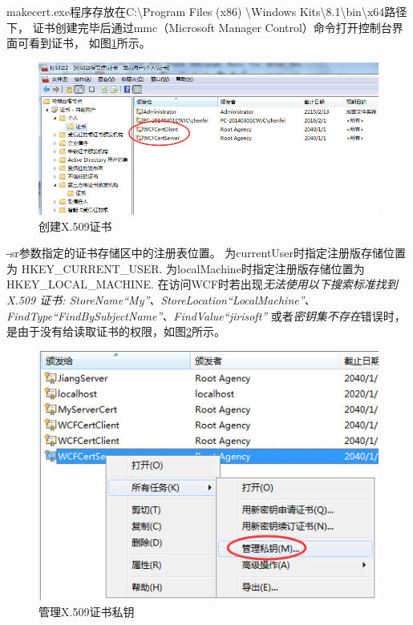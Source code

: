 \documentclass{book}
\begin{document}
makecert.exe程序存放在C:\textbackslash Program Files (x86) \textbackslash Windows Kits\textbackslash 8.1\textbackslash bin\textbackslash x64路径下，
证书创建完毕后通过mmc（Microsoft Manager Control）命令打开控制台界面可看到证书，
如图\ref{fig:X509CertForWCF}所示。

\begin{figure}[htbp]
	\centering
	\includegraphics[scale=0.6]{X509CertForWCF.jpg}
	\caption{创建X.509证书}
	\label{fig:X509CertForWCF}
\end{figure}

-sr参数指定的证书存储区中的注册表位置。
为currentUser时指定注册版存储位置为 HKEY\_CURRENT\_USER.
为localMachine时指定注册版存储位置为 HKEY\_LOCAL\_MACHINE.
在访问WCF时若出现\emph{无法使用以下搜索标准找到 X.509 证书: StoreName“My”、StoreLocation“LocalMachine”、FindType“FindBySubjectName”、FindValue“jirisoft”}
或者\emph{密钥集不存在}错误时，是由于没有给读取证书的权限，如图\ref{fig:X509ManagerPrivateKey}所示。

\begin{figure}[htbp]
	\centering
	\includegraphics[scale=0.6]{X509ManagerPrivateKey.jpg}
	\caption{管理X.509证书私钥}
	\label{fig:X509ManagerPrivateKey}
\end{figure}
\end{document}
